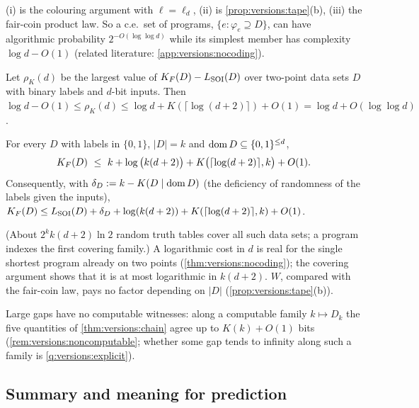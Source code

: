 (i) is the colouring argument with $\ell=\ell_d$, (ii) is \cref{prop:versions:tape}(b), (iii) the fair-coin product law. So a c.e.\ set of programs, $\{e:\varphi_e\supseteq D\}$, can have algorithmic probability $2^{-O(\log\log d)}$ while its simplest member has complexity $\log d-O(1)$ (related literature: \cref{app:versions:nocoding}).

\begin{corollary}\label{cor:versions:twopoint}
Let $\rho_K(d)$ be the largest value of $K_{F}(D)-L_{\mathrm{SOI}}(D)$ over two-point data sets $D$ with binary labels and $d$-bit inputs. Then $\log d-O(1)\le\rho_K(d)\le\log d+K(\lceil\log(d+2)\rceil)+O(1)=\log d+O(\log\log d)$.
\end{corollary}

\begin{proposition}\label{prop:versions:covering}
For every $D$ with labels in $\{0,1\}$, $|D|=k$ and $\operatorname{dom} D\subseteq\{0,1\}^{\le d}$,
\[
\KF(D)\ \le\ k+\log\big(k(d+2)\big)+K\big(\lceil\log(d+2)\rceil,k\big)+O(1).
\]
Consequently, with $\delta_D:=k-K(D\mid\operatorname{dom} D)$ (the deficiency of randomness of the labels given the inputs), $K_{F}(D)\le L_{\mathrm{SOI}}(D)+\delta_D+\log(k(d+2))+K(\lceil\log(d+2)\rceil,k)+O(1)$.
\end{proposition}

(About $2^kk(d+2)\ln2$ random truth tables cover all such data sets; a program indexes the first covering family.) A logarithmic cost in $d$ is real for the single shortest program already on two points (\cref{thm:versions:nocoding}); the covering argument shows that it is at most logarithmic in $k(d+2)$. $W$, compared with the fair-coin law, pays no factor depending on $|D|$ (\cref{prop:versions:tape}(b)).

Large gaps have no computable witnesses: along a computable family $k\mapsto D_k$ the five quantities of \cref{thm:versions:chain} agree up to $K(k)+O(1)$ bits (\cref{rem:versions:noncomputable}; whether some gap tends to infinity along such a family is \cref{q:versions:explicit}).

\subsection{Summary and meaning for prediction}\label{sec:versions:table}

